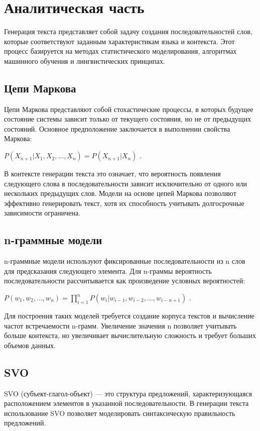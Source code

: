 \chapter{Аналитическая часть}

Генерация текста представляет собой задачу создания последовательностей слов, которые соответствуют заданным характеристикам языка и контекста. 
Этот процесс базируется на методах статистического моделирования, алгоритмах машинного обучения и лингвистических принципах. 

\section{Цепи Маркова}
Цепи Маркова представляют собой стохастические процессы, в которых будущее состояние системы зависит только от текущего состояния, но не от предыдущих состояний. 
Основное предположение заключается в выполнении свойства Маркова:

\begin{math}
    P(X_{n+1} | X_1, X_2, \ldots, X_n) = P(X_{n+1} | X_n)
\end{math} \cite{lib:markov}.

В контексте генерации текста это означает, что вероятность появления следующего слова в последовательности зависит исключительно от одного или нескольких предыдущих слов. 
Модели на основе цепей Маркова позволяют эффективно генерировать текст, хотя их способность учитывать долгосрочные зависимости ограничена.

\section{n-граммные модели}
n-граммные модели используют фиксированные последовательности из n слов для предсказания следующего элемента. 
Для n-граммы вероятность последовательности рассчитывается как произведение условных вероятностей:

\begin{math}
    P(w_1, w_2, \ldots, w_n) = \prod_{i=1}^n P(w_i | w_{i-1}, w_{i-2}, \ldots, w_{i-n+1})
\end{math} \cite{lib:markov}.

Для построения таких моделей требуется создание корпуса текстов и вычисление частот встречаемости n-грамм. 
Увеличение значения n позволяет учитывать больше контекста, но увеличивает вычислительную сложность и требует больших объемов данных.

\section{SVO}
SVO (субъект-глагол-объект) — это структура предложений, характеризующаяся расположением элементов в указанной последовательности. 
В генерации текста использование SVO позволяет моделировать синтаксическую правильность предложений. 

